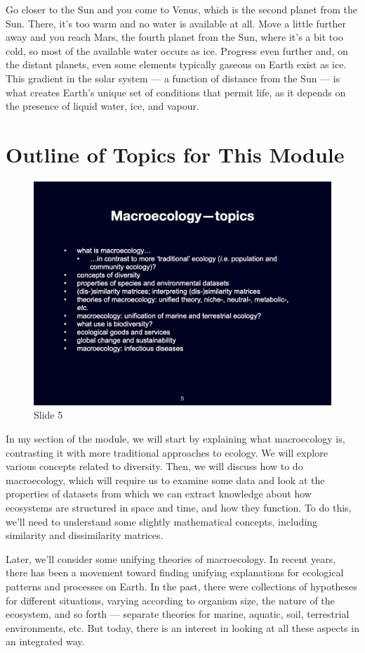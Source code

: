 \documentclass[
  10pt,
]{book}
\begin{document}
Go closer to the Sun and you come to Venus, which is the second planet
from the Sun. There, it's too warm and no water is available at all.
Move a little further away and you reach Mars, the fourth planet from
the Sun, where it's a bit too cold, so most of the available water
occurs as ice. Progress even further and, on the distant planets, even
some elements typically gaseous on Earth exist as ice. This gradient in
the solar system --- a function of distance from the Sun --- is what
creates Earth's unique set of conditions that permit life, as it depends
on the presence of liquid water, ice, and vapour.

\section{Outline of Topics for This
Module}\label{outline-of-topics-for-this-module}

\begin{figure}[ht]
\centering
\includegraphics[width=0.8\linewidth]{../images/BDC334/BDC334-005.jpeg}
\caption*{Slide 5}
\end{figure}

In my section of the module, we will start by explaining what
macroecology is, contrasting it with more traditional approaches to
ecology. We will explore various concepts related to diversity. Then, we
will discuss how to do macroecology, which will require us to examine
some data and look at the properties of datasets from which we can
extract knowledge about how ecosystems are structured in space and time,
and how they function. To do this, we'll need to understand some
slightly mathematical concepts, including similarity and dissimilarity
matrices.

Later, we'll consider some unifying theories of macroecology. In recent
years, there has been a movement toward finding unifying explanations
for ecological patterns and processes on Earth. In the past, there were
collections of hypotheses for different situations, varying according to
organism size, the nature of the ecosystem, and so forth --- separate
theories for marine, aquatic, soil, terrestrial environments, etc. But
today, there is an interest in looking at all these aspects in an
integrated way.
\end{document}
